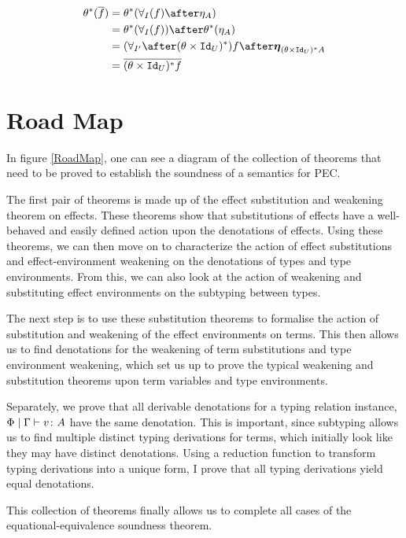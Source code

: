 \documentclass{Report}
\begin{document}
    \begin{align}\label{NaturalityCondition}
        \theta\star(\bar{f}) & = \theta\star(\allI(f)\after\eta_A)\\
        & = \theta\star(\allI(f))\after\theta\star(\eta_A)\\
        & =  (\allII\after(\theta\times\Id{U})\star)f \after\unit{(\theta\times\Id{U})\star A}\\
        & = \bar{(\theta\times\Id{U})\star f}\\
    \end{align}

\section{Road Map}
In figure \ref{RoadMap}, one can see a diagram of the collection of theorems that need to be proved to establish the soundness of a semantics for PEC.


The first pair of theorems is made up of the effect substitution and weakening theorem on effects. These theorems show that substitutions of effects have a well-behaved and easily defined action upon the denotations of effects. Using these theorems, we can then move on to characterize the action of effect substitutions and effect-environment weakening on the denotations of types and type environments. From this, we can also look at the action of weakening and substituting effect environments on the subtyping between types.

The next step is to use these substitution theorems to formalise the action of substitution and weakening of the effect environments on terms. This then allows us to find denotations for the weakening of term substitutions and type environment weakening, which set us up to prove the typical weakening and substitution theorems upon term variables and type environments. 

Separately, we prove that all derivable denotations for a typing relation instance, $\Phi\mid\Gamma \vdash v \colon A$ have the same denotation. This is important, since subtyping allows us to find multiple distinct typing derivations for terms, which initially look like they may have distinct denotations. Using a reduction function to transform typing derivations into a unique form, I prove that all typing derivations yield equal denotations.

This collection of theorems finally allows us to complete all cases of the equational-equivalence soundness theorem.
\end{document}
